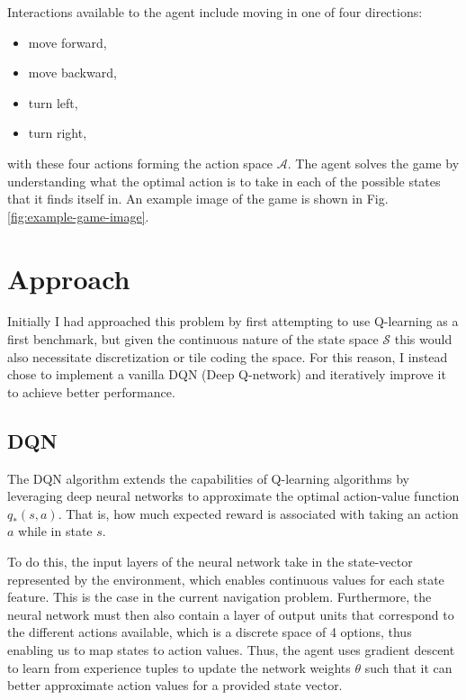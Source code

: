 \documentclass[11pt]{article}
\begin{document}
\FloatBarrier

Interactions available to the agent include moving in one of four directions:
\begin{itemize}
	\item move forward,
	\item move backward,
	\item turn left,
	\item turn right,
\end{itemize}
with these four actions forming the action space $\mathcal{A}$. The agent solves the game by understanding what the optimal action is to take in each of the possible states that it finds itself in. An example image of the game is shown in Fig. \ref{fig:example-game-image}.


\section{Approach}

Initially I had approached this problem by first attempting to use Q-learning as
a first benchmark, but given the continuous nature of the state space
$\mathcal{S}$ this would also necessitate discretization or tile coding the
space. For this reason, I instead chose to implement a vanilla DQN (Deep
Q-network) and iteratively improve it to achieve better performance.

\subsection{DQN}

The DQN algorithm extends the capabilities of Q-learning algorithms by leveraging deep neural networks to approximate the optimal action-value function $q_*(s, a)$. That is, how much expected reward is associated with taking an action $a$ while in state $s$. 

To do this, the input layers of the neural network take in the state-vector represented by the environment, which enables continuous values for each state feature. This is the case in the current navigation problem. Furthermore, the neural network must then also contain a layer of output units that correspond to the different actions available, which is a discrete space of 4 options, thus enabling us to map states to action values. Thus, the agent uses gradient descent to learn from experience tuples to update the network weights $\theta$ such that it can better approximate action values for a provided state vector.
\end{document}
